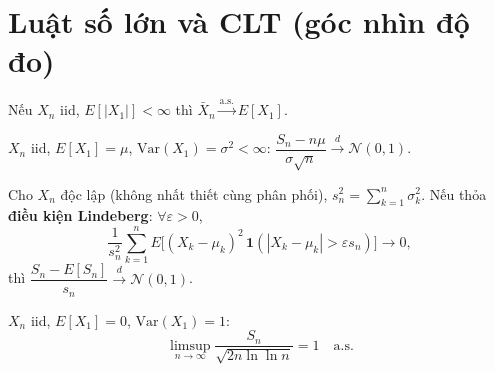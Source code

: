 \documentclass[12pt,a4paper]{article}
\begin{document}
\section{Luật số lớn và CLT (góc nhìn độ đo)}

\begin{dinhly}[title={Luật mạnh số lớn (Kolmogorov)}]
  Nếu $X_n$ iid, $E[|X_1|] < \infty$ thì $\bar{X}_n \xrightarrow{\text{a.s.}} E[X_1]$.
\end{dinhly}

\begin{dinhly}[title={CLT Lindeberg--Lévy}]
  $X_n$ iid, $E[X_1] = \mu$, $\text{Var}(X_1) = \sigma^2 < \infty$:
  $\dfrac{S_n - n\mu}{\sigma\sqrt{n}} \xrightarrow{d} \mathcal{N}(0, 1)$.
\end{dinhly}

\begin{dinhly}[title={CLT Lindeberg--Feller (không đồng phân phối)}]
  Cho $X_n$ độc lập (không nhất thiết cùng phân phối), $s_n^2 = \sum_{k=1}^n \sigma_k^2$. Nếu thỏa \textbf{điều kiện Lindeberg}: $\forall \varepsilon > 0$,
  \[
    \frac{1}{s_n^2}\sum_{k=1}^n E\bigl[(X_k - \mu_k)^2\,\mathbf{1}(|X_k - \mu_k| > \varepsilon s_n)\bigr] \to 0,
  \]
  thì $\dfrac{S_n - E[S_n]}{s_n} \xrightarrow{d} \mathcal{N}(0, 1)$.
\end{dinhly}

\begin{dinhly}[title={Luật logarit lặp (Hartman--Wintner)}]
  $X_n$ iid, $E[X_1] = 0$, $\text{Var}(X_1) = 1$:
  \[
    \limsup_{n \to \infty} \frac{S_n}{\sqrt{2n\ln\ln n}} = 1 \quad\text{a.s.}
  \]
\end{dinhly}
\end{document}
